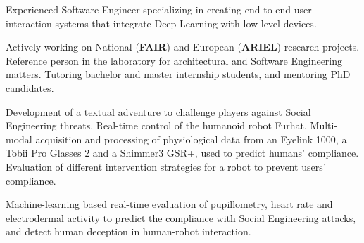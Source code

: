 \documentclass[10pt,a4paper,ragged2e]{altacv}
\begin{document}
\usepackage{fancyhdr}
\pagestyle{fancy}      %
\fancyhf{}             %




\begin{fullwidth}
\makecvheader
\end{fullwidth}


Experienced Software Engineer specializing in creating end-to-end user interaction systems that integrate Deep Learning with low-level devices.


    Actively working on National (\textbf{FAIR}) and European (\textbf{ARIEL}) research projects. Reference person in the laboratory for architectural and Software Engineering matters. Tutoring bachelor and master internship students, and mentoring PhD candidates.

    \divider    
    
    Development of a textual adventure to challenge players against Social Engineering threats. Real-time control of the humanoid robot Furhat. Multi-modal acquisition and processing of physiological data from an Eyelink 1000, a Tobii Pro Glasses 2 and a Shimmer3 GSR+, used to predict humans' compliance. Evaluation of different intervention strategies for a robot to prevent users' compliance.

    \divider    
    
    Machine-learning based real-time evaluation of pupillometry, heart rate and electrodermal activity to predict the compliance with Social Engineering attacks, and detect human deception in human-robot interaction.
\end{document}
